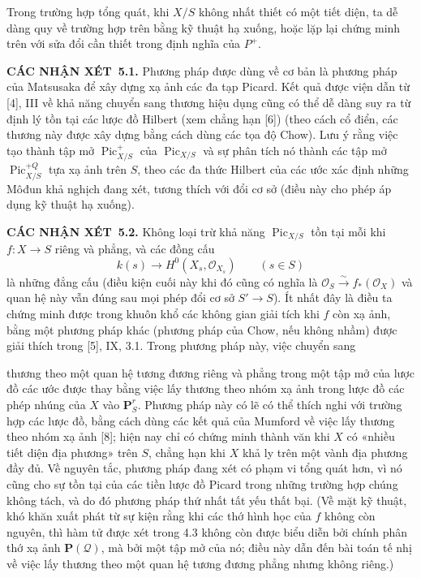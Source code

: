 \documentclass[11pt,twoside,openany]{book}
\numberwithin{equation}{section}
\newcommand{\src}[1]{%
  \phantomsection\hypertarget{src:\fgasourceid:#1}{}%
  \marginpar{\raggedleft\footnotesize\sffamily #1}%
}
\newcommand{\fgasourceid}{unset}
\newcommand{\result}[2]{\par\medskip\noindent\textbf{#1\if\relax\detokenize{#2}\relax\else\ #2\fi.}\quad}
\begin{document}
Trong trường hợp tổng quát, khi $X/S$ không nhất thiết có một tiết diện, ta dễ
dàng quy về trường hợp trên bằng kỹ thuật hạ xuống, hoặc lặp lại chứng minh
trên với sửa đổi cần thiết trong định nghĩa của $P^+$.

\result{CÁC NHẬN XÉT}{5.1} Phương pháp được dùng về cơ bản là phương pháp của
Matsusaka để xây dựng xạ ảnh các đa tạp Picard. Kết quả được viện dẫn từ [4],
III về khả năng chuyển sang thương hiệu dụng cũng có thể dễ dàng suy ra từ
định lý tồn tại các lược đồ Hilbert (xem chẳng hạn [6]) (theo cách cổ điển, các
thương này được xây dựng bằng cách dùng các tọa độ Chow). Lưu ý rằng việc tạo
thành tập mở $\operatorname{Pic}^{+}_{X/S}$ của
$\operatorname{Pic}_{X/S}$ và sự phân tích nó thành các tập mở
$\operatorname{Pic}^{+Q}_{X/S}$ tựa xạ ảnh trên $S$, theo các đa thức Hilbert
của các ước xác định những Môđun khả nghịch đang xét, tương thích với đổi cơ
sở (điều này cho phép áp dụng kỹ thuật hạ xuống).

\result{CÁC NHẬN XÉT}{5.2} Không loại trừ khả năng
$\operatorname{Pic}_{X/S}$ tồn tại mỗi khi $f:X\longrightarrow S$ riêng và
phẳng, và các đồng cấu
\[
k(s)\longrightarrow H^0(X_s,\mathcal O_{X_s})\qquad(s\in S)
\]
là những đẳng cấu (điều kiện cuối này khi đó cũng có nghĩa là
$\mathcal O_S\xrightarrow{\sim}f_*(\mathcal O_X)$ và quan hệ này vẫn đúng sau
mọi phép đổi cơ sở $S'\longrightarrow S$). Ít nhất đây là điều ta chứng minh
được trong khuôn khổ các không gian giải tích khi $f$ còn xạ ảnh, bằng một
phương pháp khác (phương pháp của Chow, nếu không nhầm) được giải thích trong
[5], IX, 3.1. Trong phương pháp này, việc chuyển sang
\src{156}
thương theo một quan hệ tương đương riêng và phẳng trong một tập mở của lược
đồ các ước được thay bằng việc lấy thương theo nhóm xạ ảnh trong lược đồ các
phép nhúng của $X$ vào $\mathbf P^r_S$. Phương pháp này có lẽ có thể thích nghi
với trường hợp các lược đồ, bằng cách dùng các kết quả của Mumford về việc lấy
thương theo nhóm xạ ảnh [8]; hiện nay chỉ có chứng minh thành văn khi $X$ có
«nhiều tiết diện địa phương» trên $S$, chẳng hạn khi $X$ khả ly trên một vành
địa phương đầy đủ. Về nguyên tắc, phương pháp đang xét
có phạm vi tổng quát hơn, vì nó cũng cho sự tồn tại của các tiền lược đồ Picard
trong những trường hợp chúng không tách, và do đó phương pháp thứ nhất tất yếu
thất bại. (Về mặt kỹ thuật, khó khăn xuất phát từ sự kiện rằng khi các thớ hình
học của $f$ không còn nguyên, thì hàm tử được xét trong 4.3 không còn được biểu
diễn bởi chính phân thớ xạ ảnh $\mathbf P(\mathcal Q)$, mà bởi một tập mở của
nó; điều này dẫn đến bài toán tế nhị về việc lấy thương theo một quan hệ tương
đương phẳng nhưng không riêng.)
\end{document}
